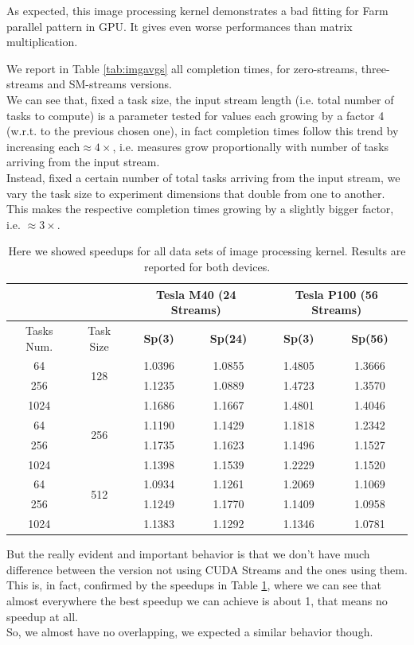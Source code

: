 As expected, this image processing kernel demonstrates a bad fitting for Farm parallel pattern in GPU. It gives even worse performances than matrix multiplication.

We report in Table \ref{tab:imgavgs} all completion times, for zero-streams, three-streams and SM-streams versions.\\
We can see that, fixed a task size, the input stream length (i.e. total number of tasks to compute) is a parameter tested for values each growing by a factor 4 (w.r.t. to the previous chosen one), in fact completion times follow this trend by increasing  each\(\approx4\times\), i.e. measures grow proportionally with number of tasks arriving from the input stream.\\
Instead, fixed a certain number of total tasks arriving from the input stream, we vary the task size to experiment dimensions that double from one to another. This makes the respective completion times growing by a slightly bigger factor, i.e. \(\approx3\times\).\\
%
%
\begin{table}	
	\centering
	\begin{tabular}{ | c  c || c | c  || c | c || } 
		\hline
		& &  \multicolumn{2}{c||}{\textbf{Tesla M40 (24 Streams)}}& \multicolumn{2}{c|}{\textbf{Tesla P100 (56 Streams)}} \\ [0.5ex]
		\hline		
		Tasks Num. & Task Size &	\textbf{Sp(3)} & \textbf{Sp(24)} &	\textbf{Sp(3)} &	\textbf{Sp(56)}\\
		\hline	\hline	
		64&	\multirow{2}{*}{128}&	1.0396&	1.0855&	1.4805&	1.3666\\
		256&	&	1.1235&	1.0889&	1.4723&	1.3570\\
		1024&	&	1.1686&	1.1667&	1.4801&	1.4046\\
		64&	\multirow{2}{*}{256}&	1.1190&	1.1429&	1.1818&	1.2342\\
		256&	&	1.1735&	1.1623&	1.1496&	1.1527\\
		1024&	&	1.1398&	1.1539&	1.2229&	1.1520\\
		64&	\multirow{2}{*}{512}&	1.0934&	1.1261&	1.2069&	1.1069\\
		256&	&	1.1249&	1.1770&	1.1409&	1.0958\\
		1024&	&	1.1383&	1.1292&	1.1346&	1.0781\\
		\hline
	\end{tabular}
	\caption{Here we showed speedups for all data sets of image processing kernel. Results are reported for both devices.}	
	\label{tab:imgspeedup}		
\end{table}
%
%
But the really evident and important behavior is that we don't have much difference between the version not using CUDA Streams and the ones using them.\\
This is, in fact, confirmed by the speedups in Table \ref{tab:imgspeedup}, where we can see that almost everywhere the best speedup we can achieve is about 1, that means no speedup at all.\\
So, we almost have no overlapping, we expected a similar behavior though.



